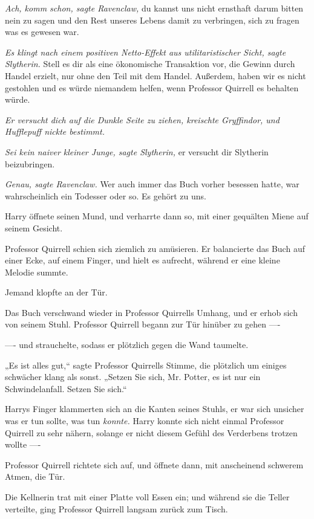 {\emph{Ach, komm schon, sagte Ravenclaw,} du kannst uns nicht ernsthaft darum bitten nein zu sagen und den Rest unseres Lebens damit zu verbringen, sich zu fragen was es gewesen war.

\emph{Es klingt nach einem positiven Netto-Effekt aus utilitaristischer Sicht, sagte Slytherin.} Stell es dir als eine ökonomische Transaktion vor, die Gewinn durch Handel erzielt, nur ohne den Teil mit dem Handel. Außerdem, haben wir es nicht gestohlen und es würde niemandem helfen, wenn Professor Quirrell es behalten würde.

\emph{Er versucht dich auf die Dunkle Seite zu ziehen, kreischte Gryffindor, und Hufflepuff nickte bestimmt.}

\emph{Sei kein naiver kleiner Junge, sagte Slytherin,} er versucht dir Slytherin beizubringen.

\emph{Genau, sagte Ravenclaw.} Wer auch immer das Buch vorher besessen hatte, war wahrscheinlich ein Todesser oder so. Es gehört zu uns.

Harry öffnete seinen Mund, und verharrte dann so, mit einer gequälten Miene auf seinem Gesicht.

Professor Quirrell schien sich ziemlich zu amüsieren. Er balancierte das Buch auf einer Ecke, auf einem Finger, und hielt es aufrecht, während er eine kleine Melodie summte.

Jemand klopfte an der Tür.

Das Buch verschwand wieder in Professor Quirrells Umhang, und er erhob sich von seinem Stuhl. Professor Quirrell begann zur Tür hinüber zu gehen ----

---- und strauchelte, sodass er plötzlich gegen die Wand taumelte.

„Es ist alles gut,“ sagte Professor Quirrells Stimme, die plötzlich um einiges schwächer klang als sonst. „Setzen Sie sich, Mr. Potter, es ist nur ein Schwindelanfall. Setzen Sie sich.“

Harrys Finger klammerten sich an die Kanten seines Stuhls, er war sich unsicher was er tun sollte, was tun \emph{konnte.} Harry konnte sich nicht einmal Professor Quirrell zu sehr nähern, solange er nicht diesem Gefühl des Verderbens trotzen wollte ----

Professor Quirrell richtete sich auf, und öffnete dann, mit anscheinend schwerem Atmen, die Tür.

Die Kellnerin trat mit einer Platte voll Essen ein; und während sie die Teller verteilte, ging Professor Quirrell langsam zurück zum Tisch.

}
